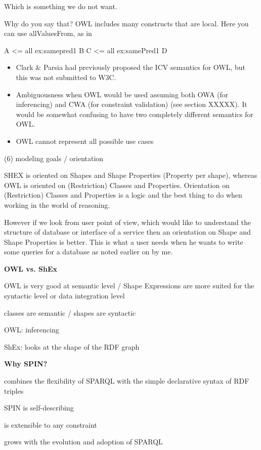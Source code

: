 \documentclass{llncs}
\begin{document}
Which is something we do not want.


Why do you say that?  OWL includes many constructs that are local.  Here you
can use allValuesFrom, as in

\begin{ex}
A <= all ex:samepred1 B
C <= all ex:samePred1 D
\end{ex}

\begin{itemize}
	\item 
	Clark & Parsia had previously proposed the ICV semantics for OWL, but this was not submitted to W3C.
	\item
	Ambiguousness when OWL would be used assuming both OWA (for inferencing) and CWA (for constraint validation) (see section XXXXX).
It would be somewhat confusing to have two completely different semantics for OWL.
	\item
	OWL cannot represent all possible use cases
\end{itemize}

(6) modeling goals / orientation

SHEX is oriented on Shapes and Shape Properties (Property per shape), 
whereas OWL is oriented on (Restriction) Classes and Properties.
Orientation on (Restriction) Classes and Properties is a logic and the best thing to do when working in the world of reasoning.

However if we look from user point of view, which would like to understand the structure of database or interface of a service then an orientation on Shape and Shape Properties is better. This is what a user needs when he wants to write some queries for a database as noted earlier on by me.

\textbf{OWL vs. ShEx}

OWL is very good at semantic level / Shape Expressions are more suited for the syntactic level or data integration level

classes are semantic / shapes are syntactic

OWL: inferencing

ShEx: looks at the shape of the RDF graph

\textbf{Why SPIN?}

combines the flexibility of SPARQL with the simple declarative syntax of RDF triples

SPIN is self-describing

is extensible to any constraint

grows with the evolution and adoption of SPARQL
\end{document}

